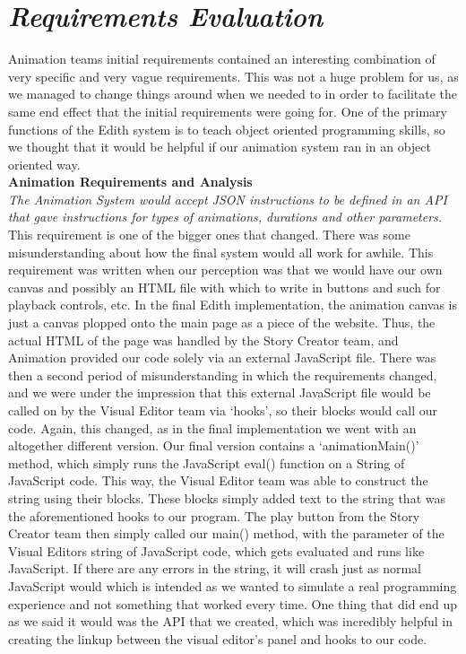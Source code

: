 \documentclass[12pt]{article}
\begin{document}
\section{\emph{Requirements Evaluation}}
Animation teams initial requirements contained an interesting combination of very specific and very vague requirements. This was not a huge problem for us, as we managed to change things around when we needed to in order to facilitate the same end effect that the initial requirements were going for. One of the primary functions of the Edith system is to teach object oriented programming skills, so we thought that it would be helpful if our animation system ran in an object oriented way. \\

\noindent \textbf{Animation Requirements and Analysis}\\

\noindent\textit{The Animation System would accept JSON instructions to be defined in an API that gave instructions for types of animations, durations and other parameters.}\\

This requirement is one of the bigger ones that changed. There was some misunderstanding about how the final system would all work for awhile. This requirement was written when our perception was that we would have our own canvas and possibly an HTML file with which to write in buttons and such for playback controls, etc. In the final Edith implementation, the animation canvas is just a canvas plopped onto the main page as a piece of the website. Thus, the actual HTML of the page was handled by the Story Creator team, and Animation provided our code solely via an external JavaScript file. There was then a second period of misunderstanding in which the requirements changed, and we were under the impression that this external JavaScript file would be called on by the Visual Editor team via ‘hooks’, so their blocks would call our code. Again, this changed, as in the final implementation we went with an altogether different version. Our final version contains a ‘animationMain()’ method, which simply runs the JavaScript eval() function on a String of JavaScript code. This way, the Visual Editor team was able to construct the string using their blocks. These blocks simply added text to the string that was the aforementioned hooks to our program. The play button from the Story Creator team then simply called our main() method, with the parameter of the Visual Editors string of JavaScript code, which gets evaluated and runs like JavaScript. If there are any errors in the string, it will crash just as normal JavaScript would which is intended as we wanted to simulate a real programming experience and not something that worked every time. 
	One thing that did end up as we said it would was the API that we created, which was incredibly helpful in creating the linkup between the visual editor’s panel and hooks to our code. \\
\end{document}
